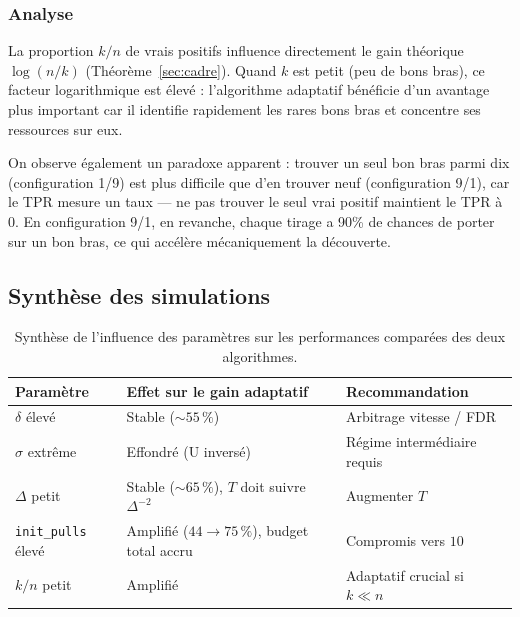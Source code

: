 \documentclass[10.5pt,a4paper]{article}
\begin{document}
\subsubsection{Analyse}

La proportion $k/n$ de vrais positifs influence directement le gain
théorique $\log(n/k)$ (Théorème~\ref{sec:cadre}). Quand $k$ est petit
(peu de bons bras), ce facteur logarithmique est élevé : l'algorithme
adaptatif bénéficie d'un avantage plus important car il identifie
rapidement les rares bons bras et concentre ses ressources sur eux.

On observe également un paradoxe apparent : trouver un seul bon bras
parmi dix (configuration 1/9) est plus difficile que d'en trouver neuf
(configuration 9/1), car le TPR mesure un taux — ne pas trouver le
seul vrai positif maintient le TPR à 0. En configuration 9/1, en
revanche, chaque tirage a 90\% de chances de porter sur un bon bras,
ce qui accélère mécaniquement la découverte.


\subsection{Synthèse des simulations}

\begin{table}[H]
\centering
\renewcommand{\arraystretch}{1.3}
\begin{tabular}{lll}
\hline
\textbf{Paramètre} & \textbf{Effet sur le gain adaptatif} & \textbf{Recommandation} \\
\hline
$\delta$ élevé              & Stable ($\sim 55\,\%$)                                  & Arbitrage vitesse / FDR \\
$\sigma$ extrême            & Effondré (U inversé)                                    & Régime intermédiaire requis \\
$\Delta$ petit              & Stable ($\sim 65\,\%$), $T$ doit suivre $\Delta^{-2}$  & Augmenter $T$ \\
\texttt{init\_pulls} élevé  & Amplifié ($44 \to 75\,\%$), budget total accru          & Compromis vers $10$ \\
$k/n$ petit                 & Amplifié                                                & Adaptatif crucial si $k\ll n$ \\
\hline
\end{tabular}
\caption{Synthèse de l'influence des paramètres sur les performances
         comparées des deux algorithmes.}
\label{tab:synthese}
\end{table}
\end{document}

